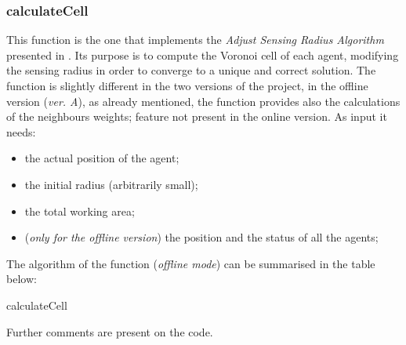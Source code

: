 \documentclass[a4paper,11pt,oneside]{book}
\makeatletter
\def\BState{\State\hskip-\ALG@thistlm}
\makeatother
\begin{document}
\subsubsection{calculateCell}
	This function is the one that implements the \textit{Adjust Sensing Radius Algorithm} presented in \cite{K1}. Its purpose is to compute the Voronoi cell of each agent, modifying the sensing radius in order to converge to a unique and correct solution. The function is slightly different in the two versions of the project, in the offline version (\textit{ver. A}), as already mentioned, the function provides also the calculations of the neighbours weights; feature not present in the online version.
	 As input it needs:
	 \begin{itemize}
	 	\item the actual position of the agent;
		\item the initial radius (arbitrarily small);
		\item the total working area;
		\item (\textit{only for the offline version}) the position and the status of all the agents;
	\end{itemize}
The algorithm of the function (\emph{offline mode}) can be summarised in the table below:
\begin{algorithm}[H]
\caption{calculateCell}\label{euclid}
\end{algorithm}

Further comments are present on the code.\\
\end{document}
